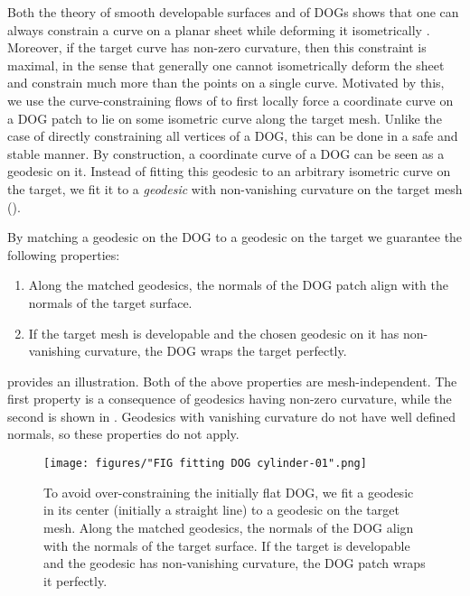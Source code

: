 Both the theory of smooth developable surfaces and of DOGs shows that one can always constrain a curve on a planar sheet while deforming it isometrically \cite{do_carmo, Rabinovich:DogNets:2018, Rabinovich:DogShapeSpace:2018}. Moreover, if the target curve has non-zero curvature, then this constraint is maximal, in the sense that generally one cannot isometrically deform the sheet and constrain much more than the points on a single curve. Motivated by this, we use the curve-constraining flows of \cite{Rabinovich:DogShapeSpace:2018} to first locally force a coordinate curve on a DOG patch to lie on some isometric curve along the target mesh. Unlike the case of directly constraining all vertices of a DOG, this can be done in a safe and stable manner. By construction, a coordinate curve of a DOG can be seen as a geodesic on it. Instead of fitting this geodesic to an arbitrary isometric curve on the target, we fit it to a \emph{geodesic} with non-vanishing curvature on the target mesh ().

By matching a geodesic on the DOG to a geodesic on the target we guarantee the following properties:
%
\begin{enumerate}
	\item Along the matched geodesics, the normals of the DOG patch align with the normals of the target surface.
	\item If the target mesh is developable and the chosen geodesic on it has non-vanishing curvature, the DOG wraps the target perfectly.
\end{enumerate}
%
 provides an illustration.  Both of the above properties are mesh-independent. The first property is a consequence of geodesics having non-zero curvature, while the second is shown in \cite{more_on_paper}. Geodesics with vanishing curvature do not have well defined normals, so these properties do not apply.

\begin{figure}[h!]
\centering
\noindent\texttt{[image: figures/"FIG fitting DOG cylinder-01".png]}
\caption{
	To avoid over-constraining the initially flat DOG, we fit a geodesic in its center (initially a straight line) to a geodesic on the target mesh. Along the matched geodesics, the normals of the DOG align with the normals of the target surface.
	If the target is developable and the geodesic has non-vanishing curvature, the DOG patch wraps it perfectly. 
	\label{fig:constraining_geodesic_to_geodesic}}
\end{figure}


